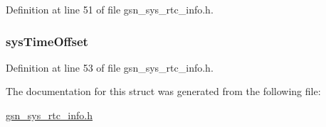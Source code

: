 Definition at line 51 of file gsn\_\-sys\_\-rtc\_\-info.h.

\hypertarget{a00255_ac97bc115dc1489ee62b582fc0672ded0}{
\subsubsection[{sysTimeOffset}]{ {\bf sysTimeOffset}}}
\label{a00255_ac97bc115dc1489ee62b582fc0672ded0}


Definition at line 53 of file gsn\_\-sys\_\-rtc\_\-info.h.



The documentation for this struct was generated from the following file:\begin{DoxyCompactItemize}
\item 
\hyperlink{a00595}{gsn\_\-sys\_\-rtc\_\-info.h}\end{DoxyCompactItemize}
